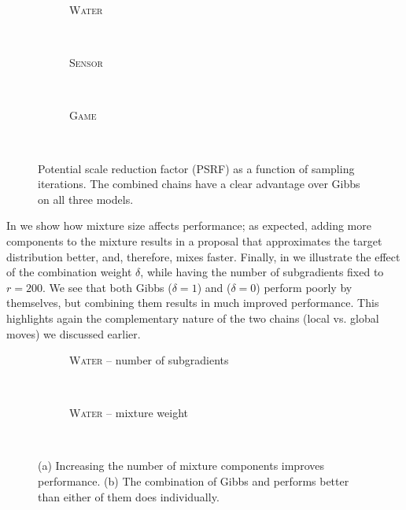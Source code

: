 \setlength{}
\setlength{}
\renewcommand{\subflen}{1.0\textwidth}
\begin{figure}[htbp]
  \begin{subfigure}[b]{\subflen}
    \centering
    
    \vspace{-0.5em}
    \caption{\textsc{Water}}
    \label{fig:water1}
  \end{subfigure}\\[1em]
  \begin{subfigure}[b]{\subflen}
    \centering
    
    \vspace{-0.5em}
    \caption{\textsc{Sensor}}
    \label{fig:berkeley1}
  \end{subfigure}\\[1em]
  \begin{subfigure}[b]{\subflen}
    \centering
    
    \vspace{-0.5em}
    \caption{\textsc{Game}}
    \label{fig:hots1}
  \end{subfigure}\\[-0.5em]
  \caption{
    Potential scale reduction factor (PSRF) as a function of sampling iterations.
    The combined chains have a clear advantage over Gibbs on all three models.
    }
  \label{fig:expsamples}
\end{figure}

In  we show how mixture size affects performance; as expected, adding more components to the mixture results in a proposal that approximates the target distribution better, and, therefore, mixes faster.
Finally, in  we illustrate the effect of the combination weight $\delta$, while having the number of subgradients fixed to $r = 200$.
We see that both Gibbs ($\delta = 1$) and \Ms{} ($\delta = 0$) perform poorly by themselves, but combining them results in much improved performance.
This highlights again the complementary nature of the two chains (local vs. global moves) we discussed earlier.

\setlength{}
\setlength{}
\renewcommand{\subflen}{\textwidth}
\begin{figure}[htbp]
  \begin{subfigure}[b]{\subflen}
    \centering
    
    \caption{\textsc{Water} -- number of subgradients}
    \label{fig:water2}
  \end{subfigure}\\[2em]
  \begin{subfigure}[b]{\subflen}
    \centering
    
    \caption{\textsc{Water} -- mixture weight}
    \label{fig:water3}
  \end{subfigure}\\
  \caption{
    (a) Increasing the number of mixture components improves performance.
    (b) The combination of Gibbs and \Ms{} performs better than either of them does individually.
  }
  \label{fig:exp2}
\end{figure}

